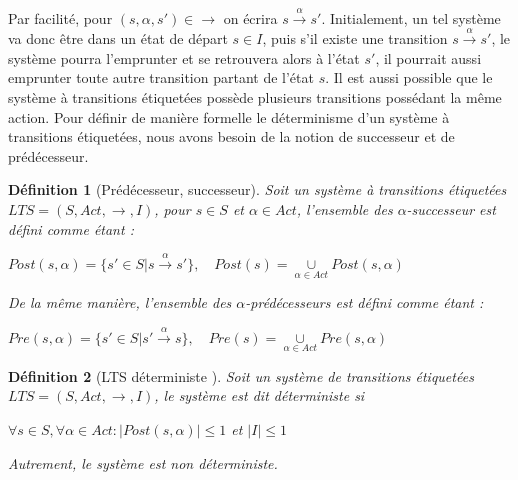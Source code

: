 \documentclass[a4paper]{report}
\theoremstyle{break}
\newtheorem{defin}{Définition}
\begin{document}
Par facilité, pour $(s, \alpha, s') \in \rightarrow$ on écrira $s\xrightarrow{\alpha}{}s'$. Initialement, un tel système va donc être dans un état de départ $s\in I$, puis s'il existe une transition $s\xrightarrow{\alpha}{}s'$, le système pourra l'emprunter et se retrouvera alors à l'état $s'$, il pourrait aussi emprunter toute autre transition partant de l'état $s$. Il est aussi possible que le système à transitions étiquetées possède plusieurs transitions possédant la même action. Pour définir de manière formelle le déterminisme d'un système à transitions étiquetées, nous avons besoin de la notion de successeur et de prédécesseur.


\begin{defin}[Prédécesseur, successeur\cite{baier2008principles}]
Soit un système à transitions étiquetées $LTS = (S, Act, \rightarrow, I)$, pour $s \in S$ et $\alpha \in Act$, l'ensemble des $\alpha$-successeur est défini comme étant :
\begin{center}
$Post(s,\alpha) = \{ s' \in S | s\xrightarrow{\alpha}{}s' \}, \quad Post(s) = \underset{\alpha \in Act}{\cup} Post(s, \alpha)$
\end{center}
De la même manière, l'ensemble des $\alpha$-prédécesseurs est défini comme étant :
\begin{center}
$Pre(s,\alpha) = \{ s' \in S | s'\xrightarrow{\alpha}{}s \}, \quad Pre(s) = \underset{\alpha \in Act}{\cup} Pre(s, \alpha)$
\end{center}
\end{defin}

\begin{defin}[LTS déterministe \cite{baier2008principles}]
Soit un système de transitions étiquetées $LTS = (S, Act, \rightarrow, I)$, le système est dit déterministe si 
\begin{center}
$\forall s \in S, \forall \alpha \in Act : |Post(s,\alpha)| \leq 1$ et $|I| \leq 1$
\end{center}
Autrement, le système est non déterministe.
\end{defin}

\end{document}
